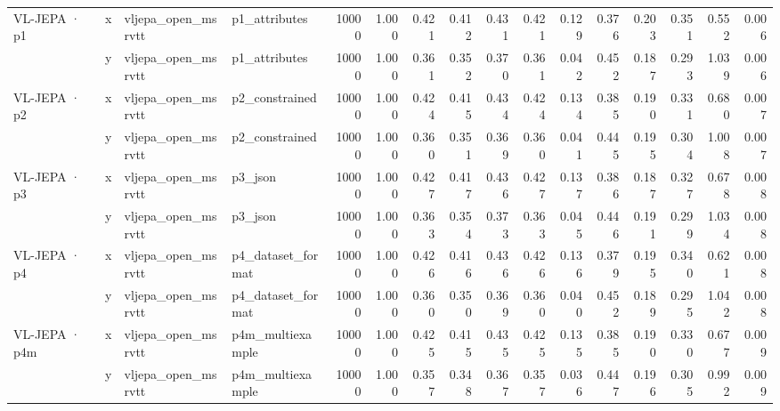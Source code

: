 \begin{tabular}{llllrrrrrrrrrrrr}
\cline{1-16}
\multirow[t]{2}{*}{VL-JEPA · p1} & x & vljepa\_open\_msrvtt & p1\_attributes & 10000 & 1.000 & 0.421 & 0.412 & 0.431 & 0.421 & 0.129 & 0.376 & 0.203 & 0.351 & 0.552 & 0.006 \\
 & y & vljepa\_open\_msrvtt & p1\_attributes & 10000 & 1.000 & 0.361 & 0.352 & 0.370 & 0.361 & 0.042 & 0.452 & 0.187 & 0.293 & 1.039 & 0.006 \\
\cline{1-16}
\multirow[t]{2}{*}{VL-JEPA · p2} & x & vljepa\_open\_msrvtt & p2\_constrained & 10000 & 1.000 & 0.424 & 0.415 & 0.434 & 0.424 & 0.134 & 0.385 & 0.190 & 0.331 & 0.680 & 0.007 \\
 & y & vljepa\_open\_msrvtt & p2\_constrained & 10000 & 1.000 & 0.360 & 0.351 & 0.369 & 0.360 & 0.041 & 0.445 & 0.195 & 0.304 & 1.008 & 0.007 \\
\cline{1-16}
\multirow[t]{2}{*}{VL-JEPA · p3} & x & vljepa\_open\_msrvtt & p3\_json & 10000 & 1.000 & 0.427 & 0.417 & 0.436 & 0.427 & 0.137 & 0.386 & 0.187 & 0.327 & 0.678 & 0.008 \\
 & y & vljepa\_open\_msrvtt & p3\_json & 10000 & 1.000 & 0.363 & 0.354 & 0.373 & 0.363 & 0.045 & 0.446 & 0.191 & 0.299 & 1.034 & 0.008 \\
\cline{1-16}
\multirow[t]{2}{*}{VL-JEPA · p4} & x & vljepa\_open\_msrvtt & p4\_dataset\_format & 10000 & 1.000 & 0.426 & 0.416 & 0.436 & 0.426 & 0.136 & 0.379 & 0.195 & 0.340 & 0.621 & 0.008 \\
 & y & vljepa\_open\_msrvtt & p4\_dataset\_format & 10000 & 1.000 & 0.360 & 0.350 & 0.369 & 0.360 & 0.040 & 0.452 & 0.189 & 0.295 & 1.042 & 0.008 \\
\cline{1-16}
\multirow[t]{2}{*}{VL-JEPA · p4m} & x & vljepa\_open\_msrvtt & p4m\_multiexample & 10000 & 1.000 & 0.425 & 0.415 & 0.435 & 0.425 & 0.135 & 0.385 & 0.190 & 0.330 & 0.677 & 0.009 \\
 & y & vljepa\_open\_msrvtt & p4m\_multiexample & 10000 & 1.000 & 0.357 & 0.348 & 0.367 & 0.357 & 0.036 & 0.447 & 0.196 & 0.305 & 0.992 & 0.009 \\
\cline{1-16}
\bottomrule
\end{tabular}
